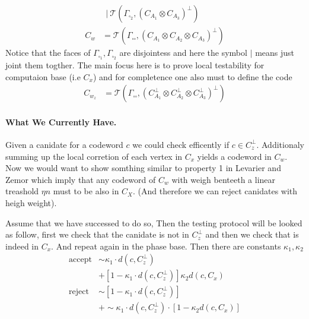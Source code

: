 \documentclass{article}
\begin{document}
\begin{multicols*}{2}
\begin{equation*}
\begin{split}
	    & \ \ | \ \mathcal{T}\left( \Gamma_{\square_{2}}, \left(  C_{A_1} \otimes C_{A_3} \right)^{\perp}  \right) \\
	    C_{w} &=  \mathcal{T}\left( \Gamma_{\square \square}, \left(  C_{A_1} \otimes C_{A_2} \otimes C_{A_3} \right)^{\perp}  \right)   
	  \end{split}
	\end{equation*}
	Notice that the faces of $\Gamma_{\square_{1}},\Gamma_{\square_{2}}$ are disjointess and here the symbol $|$ means just joint them togther. 
	The main focus here is to prove local testability for computaion base (i.e $C_{x}$) and for completence one also must to define the code 
	\begin{equation*}
	  \begin{split}
	    C_{w_{z}} &=  \mathcal{T}\left( \Gamma_{\square \square}, \left(  C_{A_1}^\perp \otimes C_{A_2}^\perp \otimes C_{A_3}^\perp \right)^{\perp}  \right)   
	  \end{split}
	\end{equation*}
	\paragraph{What We Currently Have.} Given a canidate for a codeword $c$ we could check efficently if $c\in C_{z}^\perp$.  
	Additionaly summing up the local corretion of each vertex in $C_{x}$ yields a codeword in $C_{w}$. Now we would want to show 
	somthing similar to property 1 in Levarier and Zemor which imply that any codeword of $C_{w}$ with weigh benteeth 
	a linear treashold $\eta n $ must to be also in $C_{X}$. (And therefore we can reject canidates with heigh weight). 

	Assume that we have successed to do so, Then the testing protocol will be looked as follow, 
	first we check that the canidate is not in $C_{z}^\perp$ and then we check that is indeed in $C_{x}$. And repeat again 
	in the phase base. Then there are constants $\kappa_1, \kappa_2$ 
	\begin{equation*}
	  \begin{split}
	    \text{accept} & \sim \kappa_1 \cdot  d\left( c,C_{z}^\perp \right)  \\ 
	    & +  \left[ 1 -  \kappa_1 \cdot  d\left( c,C_{z}^\perp \right)\right] \kappa_{2} d\left( c, C_{x} \right) \\
	    \text{reject} & \sim  \left[ 1 -  \kappa_1 \cdot  d\left( c,C_{z}^\perp \right)\right] \\ 
	    & +\sim \kappa_1 \cdot  d\left( c,C_{z}^\perp \right) \cdot \left[ 1 - \kappa_{2} d\left( c, C_{x} \right) \right] 
	  \end{split}
	\end{equation*}

\end{multicols*}
\end{document}
